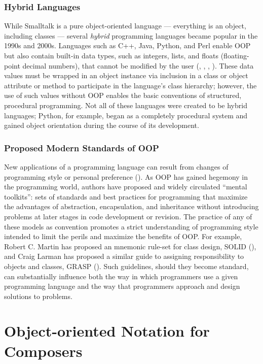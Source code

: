 \subsubsection{Hybrid Languages}
While Smalltalk is a pure object-oriented language --- everything is an object, including classes --- several \emph{hybrid} programming languages became popular in the 1990s and 2000s. Languages such as C++, Java, Python, and Perl enable OOP but also contain built-in data types, such as integers, lists, and floats (floating-point decimal numbers), that cannot be modified by the user (\cite{Schwarz:1993vn}, \cite{Gosling:2000ly}, \cite{Van-Rossum:2003ys}, \cite{Holzner:1999zr}). These data values must be wrapped in an object instance via inclusion in a class or object attribute or method to participate in the language's class hierarchy; however, the use of such values without OOP enables the basic conventions of structured, procedural programming. Not all of these languages were created to be hybrid languages; Python, for example, began as a completely procedural system and gained object orientation during the course of its development.
\subsubsection{Proposed Modern Standards of OOP}
	New applications of a programming language can result from changes of programming style or personal preference (\cite{Sammet:1991pd}). As OOP has gained hegemony in the programming world, authors have proposed and widely circulated ``mental toolkits'': sets of standards and best practices for programming that maximize the advantages of abstraction, encapsulation, and inheritance without introducing problems at later stages in code development or revision. The practice of any of these models as convention promotes a strict understanding of programming style intended to limit the perils and maximize the benefits of OOP. For example, Robert C. Martin has proposed an mnemonic rule-set for class design, SOLID (\cite{Martin:yq}), and Craig Larman has proposed a similar guide to assigning responsibility to objects and classes, GRASP (\cite{Larman:2002gf}). Such guidelines, should they become standard, can substantially influence both the way in which programmers use a given programming language and the way that programmers approach and design solutions to problems. 

\section{Object-oriented Notation for Composers}

